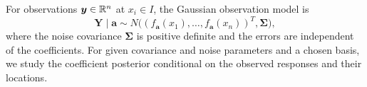 \label{sec:finite-model}
For observations $\boldsymbol y\in\mathbb R^n$ at $x_i\in I$,
the Gaussian observation model is
\[
 \boldsymbol Y\mid\boldsymbol a\sim
 N\bigl((f_{\boldsymbol a}(x_1),\ldots,f_{\boldsymbol a}(x_n))^T,
        \boldsymbol\Sigma\bigr),
\]
where the noise covariance $\boldsymbol\Sigma$ is positive
definite and the errors are independent of the coefficients.
For given covariance and noise parameters and a chosen basis, we study
the coefficient posterior conditional on the observed responses and
their locations.
